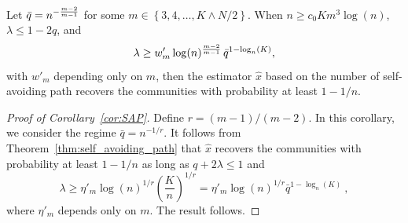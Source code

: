 \documentclass[final]{colt2026}
\newcommand{\1}{\mathbf{1}}
\newcommand{\pa}[1]{\left(#1\right)}
\newcommand{\ac}[1]{\left\{#1\right\}}
\begin{document}
\begin{corollary}\label{cor:SAP}
Let  $\bar q=n^{-{m-2\over m-1}}$ for some  $m\in \ac{3,4,\ldots, K\wedge N/2}$. When $n\geq c_0Km^3\log(n)$, $\lambda \leq 1-2q$, and 
\begin{equation}\label{eq:SAP:final}
\lambda \geq w'_{m} \log(n)^{m-2\over m-1} \, \bar q^{1-\log_{n}(K)},%
\end{equation}
with $w'_{m}$ depending only on $m$, then the  estimator $\hat{x}$ based on the number of self-avoiding path recovers the communities with probability at least $1-1/n$. 
\end{corollary}

\begin{proof}[Proof of Corollary~\ref{cor:SAP}]
Define $r = (m-1)/(m-2)$. In this corollary, we consider the regime $\bar{q}= n^{-1/r}$. It follows from Theorem~\ref{thm:self_avoiding_path} that $\hat{x}$ recovers the communities with probability at least $1-1/n$ as long as $q+ 2\lambda \leq 1$ and 
\[
\lambda \geq \eta'_{m} \log(n)^{1/r} \left(\frac{K}{n}\right)^{1/r}= \eta'_m  \log(n)^{1/r} \bar{q}^{1-\log_n(K)} \  ,
\]
where $\eta'_m$ depends only on $m$. The result follows.
\end{proof}
\end{document}
